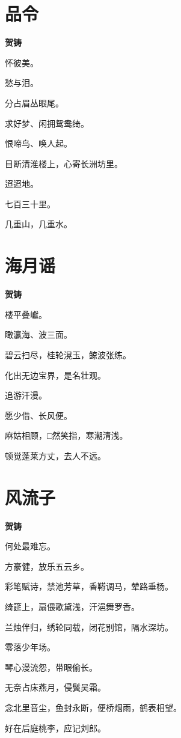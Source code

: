 \documentclass[12pt,a4paper]{ctexbook}
\begin{document}
\section{品令}
\textbf{贺铸}\par\vspace{0.5em}
怀彼美。\par
愁与泪。\par
分占眉丛眼尾。\par
求好梦、闲拥鸳鸯绮。\par
恨啼鸟、唤人起。\par
目断清淮楼上，心寄长洲坊里。\par
迢迢地。\par
七百三十里。\par
几重山，几重水。\par

\section{海月谣}
\textbf{贺铸}\par\vspace{0.5em}
楼平叠巘。\par
瞰瀛海、波三面。\par
碧云扫尽，桂轮滉玉，鲸波张练。\par
化出无边宝界，是名壮观。\par
追游汗漫。\par
愿少借、长风便。\par
麻姑相顾，□然笑指，寒潮清浅。\par
顿觉蓬莱方丈，去人不远。\par

\section{风流子}
\textbf{贺铸}\par\vspace{0.5em}
何处最难忘。\par
方豪健，放乐五云乡。\par
彩笔赋诗，禁池芳草，香鞯调马，辇路垂杨。\par
绮筵上，扇偎歌黛浅，汗浥舞罗香。\par
兰烛伴归，绣轮同载，闭花别馆，隔水深坊。\par
零落少年场。\par
琴心漫流怨，带眼偷长。\par
无奈占床燕月，侵鬓吴霜。\par
念北里音尘，鱼封永断，便桥烟雨，鹤表相望。\par
好在后庭桃李，应记刘郎。\par
\end{document}
